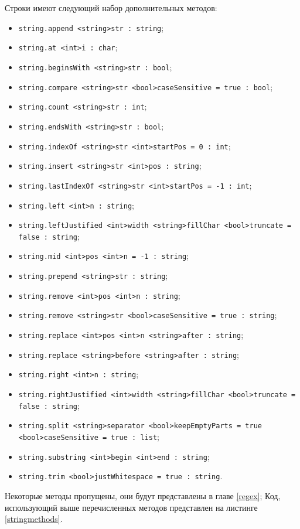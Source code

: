 \documentclass[a4paper, 14pt]{extarticle}
\newenvironment{icItems}
	{ \begin{itemize} [noitemsep,nolistsep] }
	{ \end{itemize} }
\begin{document}
Строки имеют следующий набор дополнительных методов:
\begin{icItems}
\item
	\lstinline|string.append <string>str : string|;
\item
	\lstinline|string.at <int>i : char|;
\item
	\lstinline|string.beginsWith <string>str : bool|;
\item
	\lstinline|string.compare <string>str <bool>caseSensitive = true : bool|;
\item
	\lstinline|string.count <string>str : int|;
\item
	\lstinline|string.endsWith <string>str : bool|;
\item
	\lstinline|string.indexOf <string>str <int>startPos = 0 : int|;
\item
	\lstinline|string.insert <string>str <int>pos : string|;
\item
	\lstinline|string.lastIndexOf <string>str <int>startPos = -1 : int|;
\item
	\lstinline|string.left <int>n : string|;
\item
	\lstinline|string.leftJustified <int>width <string>fillChar <bool>truncate = false : string|;
\item
	\lstinline|string.mid <int>pos <int>n = -1 : string|;
\item
	\lstinline|string.prepend <string>str : string|;
\item
	\lstinline|string.remove <int>pos <int>n : string|;
\item
	\lstinline|string.remove <string>str <bool>caseSensitive = true : string|;
\item
	\lstinline|string.replace <int>pos <int>n <string>after : string|;
\item
	\lstinline|string.replace <string>before <string>after : string|;
\item
	\lstinline|string.right <int>n : string|;
\item
	\lstinline|string.rightJustified <int>width <string>fillChar <bool>truncate = false : string|;
\item
	\lstinline|string.split <string>separator <bool>keepEmptyParts = true <bool>caseSensitive = true : list|;
\item
	\lstinline|string.substring <int>begin <int>end : string|;
\item
	\lstinline|string.trim <bool>justWhitespace = true : string|.
\end{icItems}

Некоторые методы пропущены, они будут представлены в главе \ref{regex}; Код, использующий выше перечисленных методов представлен на листинге \ref{stringmethods}.
\end{document}

